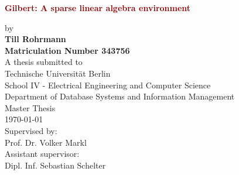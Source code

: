 \begin{titlepage}
	\strut
	\hfill
	\begin{center}
	\vspace{1cm}
		\Huge
		\begin{spacing}{.9}
			\textcolor{DarkRed}{\textbf{Gilbert: A sparse linear algebra environment}}\\
		\end{spacing}
		\vspace{0.8cm}
		\large
		by\\
		\vspace{0.8cm} 
		\textbf{Till Rohrmann}\\
		\vspace{0.8cm} 
		\textbf{Matriculation Number 343756}\\
		\vspace{2cm} 
	 	A thesis submitted to\\
		\vspace{0.5cm}
		Technische Universität Berlin\\
		School IV - Electrical Engineering and Computer Science\\
		Department of Database Systems and Information Management\\
		\vspace{0.5cm}
		Master Thesis\\
		\vspace{2.2cm}
		\today\\
		\vspace{2.0cm}
		\large
		Supervised by:\\
		Prof. Dr. Volker Markl\\
		\vspace{1cm}
		Assistant supervisor:\\
		Dipl. Inf. Sebastian Schelter
		\end{center}
\end{titlepage}